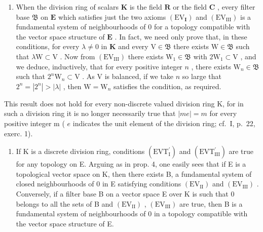 \begin{enumerate}
\def\labelenumi{\arabic{enumi})}
\setcounter{enumi}{1}
\tightlist
\item
  When the division ring of scalars \(\mathbf{K}\) is the field \(\mathbf{R}\) or the field \(\mathbf{C}\) , every filter base \(\mathfrak{B}\) on \(\mathbf{E}\) which satisfies just the two axioms \((\mathrm{EV}_{\mathbf{I}})\) and \((\mathrm{EV}_{\mathrm{III}})\) is a fundamental system of neighbourhoods of 0 for a topology compatible with the vector space structure of \(\mathbf{E}\) . In fact, we need only prove that, in these conditions, for every \(\lambda \neq 0\) in \(\mathbf{K}\) and every \(\mathrm{V} \in \mathfrak{B}\) there exists \(\mathrm{W} \in \mathfrak{B}\) such that \(\lambda \mathrm{W} \subset \mathrm{V}\) . Now from \((\mathrm{EV}_{\mathrm{III}})\) there exists \(\mathrm{W}_{1} \in \mathfrak{B}\) with \(2\mathrm{W}_{1} \subset \mathrm{V}\) , and we deduce, inductively, that for every positive integer \(n\) , there exists \(\mathrm{W}_{n} \in \mathfrak{B}\) such that \(2^{n}\mathrm{W}_{n} \subset \mathrm{V}\) . As \(\mathrm{V}\) is balanced, if we take \(n\) so large that \(2^{n} = |2^{n}| > |\lambda|\) , then \(\mathrm{W} = \mathrm{W}_{n}\) satisfies the condition, as required.
\end{enumerate}

This result does not hold for every non-discrete valued division ring K, for in such a division ring it is no longer necessarily true that \(|me| = m\) for every positive integer m ( \(e\) indicates the unit element of the division ring; cf.~I, p.~22, exerc. 1).

\begin{enumerate}
\def\labelenumi{\arabic{enumi})}
\setcounter{enumi}{2}
\tightlist
\item
  If K is a discrete division ring, conditions \((\mathrm{EVT}_{\mathrm{I}}^{\prime})\) and \((\mathrm{EVT}_{\mathrm{III}}^{\prime})\) are true for any topology on E. Arguing as in prop. 4, one easily sees that if E is a topological vector space on K, then there exists B, a fundamental system of closed neighbourhoods of 0 in E satisfying conditions \((\mathrm{EV}_{\mathrm{II}})\) and \((\mathrm{EV}_{\mathrm{III}})\) . Conversely, if a filter base B on a vector space E over K is such that 0 belongs to all the sets of B and \((\mathrm{EV}_{\mathrm{II}})\) , \((\mathrm{EV}_{\mathrm{III}})\) are true, then B is a fundamental system of neighbourhoods of 0 in a topology compatible with the vector space structure of E.
\end{enumerate}

